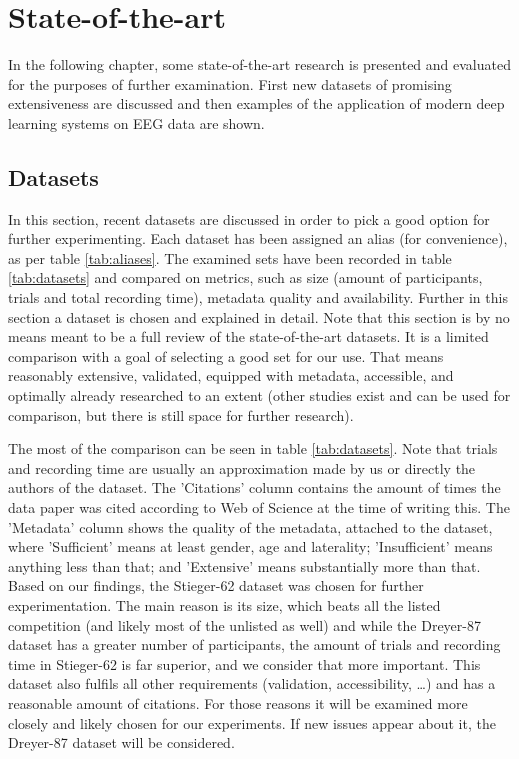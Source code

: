 \documentclass[english, he, bc, kiv, iso690alph]{fasthesis}
\begin{document}
\chapter{State-of-the-art}

In the following chapter, some state-of-the-art research is presented and evaluated for the purposes of further examination. First new datasets of promising extensiveness are discussed and then examples of the application of modern deep learning systems on EEG data are shown.

\section{Datasets}

In this section, recent datasets are discussed in order to pick a good option for further experimenting. Each dataset has been assigned an alias (for convenience), as per table \ref{tab:aliases}. The examined sets have been recorded in table \ref{tab:datasets} and compared on metrics, such as size (amount of participants, trials and total recording time), metadata quality and availability. Further in this section a dataset is chosen and explained in detail. Note that this section is by no means meant to be a full review of the state-of-the-art datasets. It is a limited comparison with a goal of selecting a good set for our use. That means reasonably extensive, validated, equipped with metadata, accessible, and optimally already researched to an extent (other studies exist and can be used for comparison, but there is still space for further research).

The most of the comparison can be seen in table \ref{tab:datasets}. Note that trials and recording time are usually an approximation made by us or directly the authors of the dataset. The 'Citations' column contains the amount of times the data paper was cited according to Web of Science at the time of writing this. The 'Metadata' column shows the quality of the metadata, attached to the dataset, where 'Sufficient' means at least gender, age and laterality; 'Insufficient' means anything less than that; and 'Extensive' means substantially more than that.
Based on our findings, the Stieger-62 dataset was chosen for further experimentation. The main reason is its size, which beats all the listed competition (and likely most of the unlisted as well) and while the Dreyer-87 dataset has a greater number of participants, the amount of trials and recording time in Stieger-62 is far superior, and we consider that more important. This dataset also fulfils all other requirements (validation, accessibility, \dots) and has a reasonable amount of citations. For those reasons it will be examined more closely and likely chosen for our experiments. If new issues appear about it, the Dreyer-87 dataset will be considered.
\end{document}
